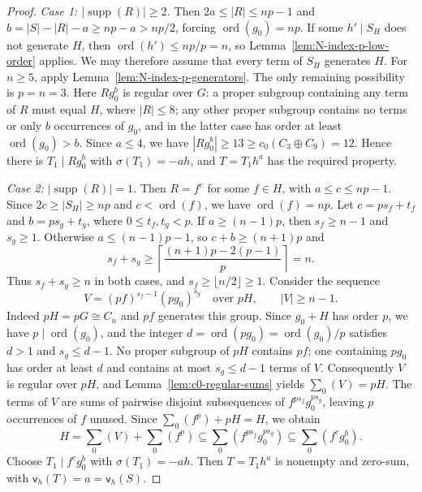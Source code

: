 \documentclass[10pt,reqno]{amsart}
\theoremstyle{definition}
\theoremstyle{remark}
\numberwithin{equation}{section}
\DeclareMathOperator{\ord}{ord}
\DeclareMathOperator{\supp}{supp}
\begin{document}
\begin{proof}
\smallskip\noindent\emph{Case 1: $|\supp(R)|\ge2$.}
Then $2a\le|R|\le np-1$ and
$b=|S|-|R|-a\ge np-a>np/2$, forcing $\ord(g_0)=np$.
If some $h'\mid S_H$ does not generate $H$, then
$\ord(h')\le np/p=n$, so Lemma~\ref{lem:N-index-p-low-order} applies.
We may therefore assume that every term of $S_H$ generates $H$.
For $n\ge5$, apply Lemma~\ref{lem:N-index-p-generators}.
The only remaining possibility is $p=n=3$.
Here $Rg_0^b$ is regular over $G$: a proper subgroup containing
any term of $R$ must equal $H$, where $|R|\le8$; any other proper
subgroup contains no terms or only $b$ occurrences of $g_0$,
and in the latter case has order at least $\ord(g_0)>b$.
Since $a\le4$, we have $|Rg_0^b|\ge13\ge c_0(C_3\oplus C_9)=12$.
Hence there is $T_1\mid Rg_0^b$ with $\sigma(T_1)=-ah$,
and $T=T_1h^a$ has the required property.

\smallskip\noindent\emph{Case 2: $|\supp(R)|=1$.}
Then $R=f^c$ for some $f\in H$, with $a\le c\le np-1$.
Since $2c\ge|S_H|\ge np$ and $c<\ord(f)$, we have $\ord(f)=np$.
Let $c=ps_f+t_f$ and $b=ps_g+t_g$, where $0\le t_f,t_g<p$.
If $a\ge(n-1)p$, then $s_f\ge n-1$ and $s_g\ge1$.
Otherwise $a\le(n-1)p-1$, so $c+b\ge(n+1)p$ and
\[
 s_f+s_g\ge
 \left\lceil\frac{(n+1)p-2(p-1)}p\right\rceil=n.
\]
Thus $s_f+s_g\ge n$ in both cases, and $s_f\ge\lfloor n/2\rfloor\ge1$.
Consider the sequence
\[
 V=(pf)^{s_f-1}(pg_0)^{s_g}\quad\text{over }pH,
 \qquad |V|\ge n-1.
\]
Indeed $pH=pG\cong C_n$ and $pf$ generates this group.
Since $g_0+H$ has order $p$, we have $p\mid\ord(g_0)$, and the integer
$d=\ord(pg_0)=\ord(g_0)/p$ satisfies $d>1$ and $s_g\le d-1$.
No proper subgroup of $pH$ contains $pf$; one containing $pg_0$
has order at least $d$ and contains at most $s_g\le d-1$ terms of $V$.
Consequently $V$ is regular over $pH$, and
Lemma~\ref{lem:c0-regular-sums} yields $\sum_0(V)=pH$.
The terms of $V$ are sums of pairwise disjoint subsequences of
$f^{ps_f}g_0^{ps_g}$, leaving $p$ occurrences of $f$ unused.
Since $\sum_0(f^p)+pH=H$, we obtain
\[
 H=\sum_0(V)+\sum_0(f^p)
 \subseteq\sum_0(f^{ps_f}g_0^{ps_g})
 \subseteq\sum_0(f^cg_0^b).
\]
Choose $T_1\mid f^cg_0^b$ with $\sigma(T_1)=-ah$.
Then $T=T_1h^a$ is nonempty and zero-sum, with $\mathsf v_h(T)=a=\mathsf v_h(S)$.
\end{proof}
\end{document}
